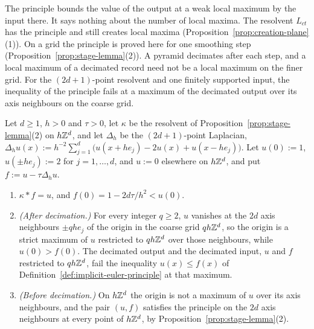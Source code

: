 The principle bounds the value of the output at a weak local maximum by the input there. It says
nothing about the number of local maxima. The resolvent $L_{ct}$ has the principle and still
creates local maxima (Proposition~\ref{prop:creation-plane}(1)). On a grid the principle is proved
here for one smoothing step (Proposition~\ref{prop:stage-lemma}(2)). A pyramid decimates after
each step, and a local maximum of a decimated record need not be a local maximum on the finer grid.
For the $(2d+1)$-point resolvent and one finitely supported input, the inequality of the principle
fails at a maximum of the decimated output over its axis neighbours on the coarse grid.

\begin{proposition}
\label{prop:principle-after-decimation}

Let $d \ge 1$, $h > 0$ and $\tau > 0$, let $\kappa$ be the resolvent of
Proposition~\ref{prop:stage-lemma}(2) on $h\mathbb{Z}^d$, and let $\Delta_h$ be the $(2d+1)$-point
Laplacian, $\Delta_hu(x) := h^{-2}\sum_{j=1}^d\bigl(u(x + he_j) - 2u(x) + u(x - he_j)\bigr)$. Let
$u(0) := 1$, $u(\pm he_j) := 2$ for $j = 1, \dots, d$, and $u := 0$ elsewhere on $h\mathbb{Z}^d$, and put
$f := u - \tau\Delta_hu$.
\begin{enumerate}
\item $\kappa * f = u$, and $f(0) = 1 - 2d\tau/h^2 < u(0)$.
\item \emph{(After decimation.)} For every integer $q \ge 2$, $u$ vanishes at the $2d$ axis
neighbours $\pm qhe_j$ of the origin in the coarse grid $qh\mathbb{Z}^d$, so the origin is a strict
maximum of $u$ restricted to $qh\mathbb{Z}^d$ over those neighbours, while $u(0) > f(0)$. The decimated
output and the decimated input, $u$ and $f$ restricted to $qh\mathbb{Z}^d$, fail the inequality
$u(x) \le f(x)$ of Definition~\ref{def:implicit-euler-principle} at that maximum.
\item \emph{(Before decimation.)} On $h\mathbb{Z}^d$ the origin is not a maximum of $u$ over its axis
neighbours, and the pair $(u, f)$ satisfies the principle on the $2d$ axis neighbours at every
point of $h\mathbb{Z}^d$, by Proposition~\ref{prop:stage-lemma}(2).
\end{enumerate}
\end{proposition}

